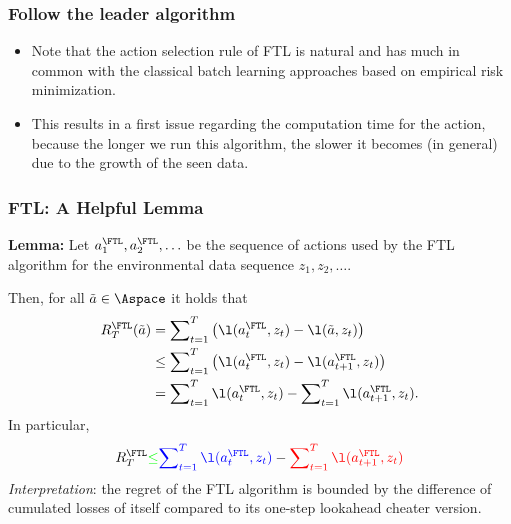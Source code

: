 \documentclass[11pt,compress,t,notes=noshow, xcolor=table]{beamer}
\begin{document}
\begin{frame} 
	\frametitle{Follow the leader algorithm}
	\footnotesize
	
	
	\begin{itemize}
		\item Note that the action selection rule of FTL is natural and has much in common with the classical batch learning approaches based on empirical risk minimization.
		
		\item 	This results in a first issue regarding the computation time for the action, because the longer we run this algorithm, the slower it becomes (in general) due to the growth of the seen data.
	\end{itemize}
\end{frame}

\begin{frame} 
	\frametitle{FTL: A Helpful Lemma}
	\small
	 \textbf{Lemma:}
		Let $a_1^{\FTL}, a_2^{\FTL}, \ldots$ be the sequence of actions used by the FTL algorithm for the environmental data sequence $z_1,z_2,\ldots .$
		\pause
		
		 Then, for all $\tilde a \in \Aspace$ it holds that 
		\begin{align*}
			R_T^{\FTL}(\tilde a) 
			&= \sum\nolimits_{t=1}^T \left(\l(a_t^{\FTL},z_t) - \l(\tilde a,z_t)\right) \\
%			
			& \leq \sum\nolimits_{t=1}^T \left(\l(a_t^{\FTL},z_t) - \l(a_{t+1}^{\FTL},z_t)\right)\\
%			
			&= \sum\nolimits_{t=1}^T \l(a_t^{\FTL},z_t) -  \sum\nolimits_{t=1}^T  \l(a_{t+1}^{\FTL},z_t) .
		\end{align*}
		\pause 
		 In particular,
		\begin{equation*}
			R_T^{\FTL} {\color{green} \leq}    {\color{blue} \sum\nolimits_{t=1}^T \l(a_t^{\FTL},z_t) }-  {\color{red}\sum\nolimits_{t=1}^T  \l(a_{t+1}^{\FTL},z_t)}
		\end{equation*}
		\pause
		 \emph{Interpretation}: the regret of the FTL algorithm is {\color{green}bounded} by {\color{blue} the difference of cumulated losses of itself} compared to {\color{red} its one-step lookahead cheater version}.
\end{frame}
\end{document}
